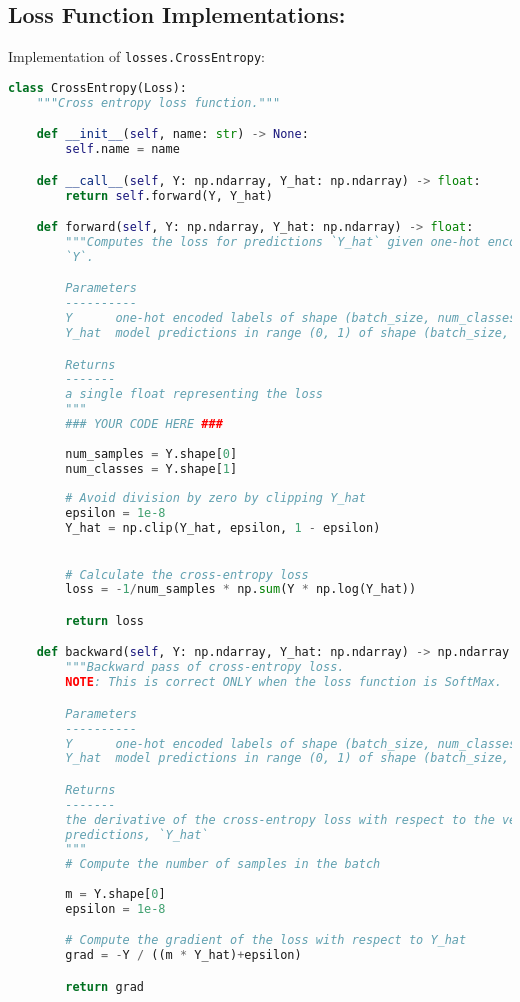 \subsection{Loss Function Implementations:}

Implementation of \texttt{losses.CrossEntropy}:

\begin{lstlisting}[language=Python]
class CrossEntropy(Loss):
    """Cross entropy loss function."""

    def __init__(self, name: str) -> None:
        self.name = name

    def __call__(self, Y: np.ndarray, Y_hat: np.ndarray) -> float:
        return self.forward(Y, Y_hat)

    def forward(self, Y: np.ndarray, Y_hat: np.ndarray) -> float:
        """Computes the loss for predictions `Y_hat` given one-hot encoded labels
        `Y`.

        Parameters
        ----------
        Y      one-hot encoded labels of shape (batch_size, num_classes)
        Y_hat  model predictions in range (0, 1) of shape (batch_size, num_classes)

        Returns
        -------
        a single float representing the loss
        """
        ### YOUR CODE HERE ###
        
        num_samples = Y.shape[0]
        num_classes = Y.shape[1]
        
        # Avoid division by zero by clipping Y_hat
        epsilon = 1e-8
        Y_hat = np.clip(Y_hat, epsilon, 1 - epsilon)
       

        # Calculate the cross-entropy loss
        loss = -1/num_samples * np.sum(Y * np.log(Y_hat))

        return loss

    def backward(self, Y: np.ndarray, Y_hat: np.ndarray) -> np.ndarray:
        """Backward pass of cross-entropy loss.
        NOTE: This is correct ONLY when the loss function is SoftMax.

        Parameters
        ----------
        Y      one-hot encoded labels of shape (batch_size, num_classes)
        Y_hat  model predictions in range (0, 1) of shape (batch_size, num_classes)

        Returns
        -------
        the derivative of the cross-entropy loss with respect to the vector of
        predictions, `Y_hat`
        """
        # Compute the number of samples in the batch
        
        m = Y.shape[0]
        epsilon = 1e-8

        # Compute the gradient of the loss with respect to Y_hat
        grad = -Y / ((m * Y_hat)+epsilon)

        return grad

\end{lstlisting}

